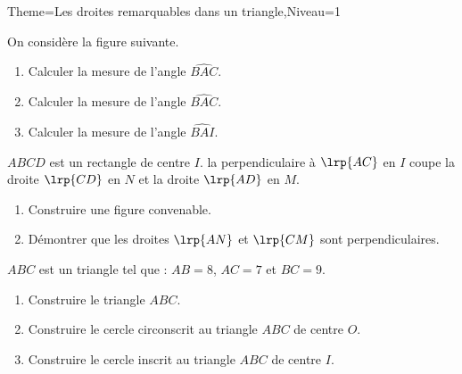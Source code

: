 \documentclass[a4paper,12pt]{article}
\begin{document}
\begin{Maquette}[Fiche]{Theme=Les droites remarquables dans un triangle,Niveau=1}
\begin{exercice}
\begin{minipage}{0.5\linewidth}
On considère la figure suivante.
\begin{enumerate}
\item Calculer la mesure de l'angle $\widehat{BAC}$.
\item Calculer la mesure de l'angle $\widehat{BAC}$.
\item Calculer la mesure de l'angle $\widehat{BAI}$.
\end{enumerate}
\end{minipage}%
\begin{minipage}{0.5\linewidth}
\end{minipage}
\end{exercice}

\begin{exercice}
$ABCD$ est un rectangle de centre $I$. la perpendiculaire à $\lrp{AC}$ en $I$ coupe la droite $\lrp{CD}$ en $N$ et la droite $\lrp{AD}$ en $M$.
\begin{enumerate}
\item Construire une figure convenable.
\item Démontrer que les droites $\lrp{AN}$ et $\lrp{CM}$ sont perpendiculaires.
\end{enumerate}
\end{exercice}

\begin{exercice}
$ABC$ est un triangle tel que : $AB=8$, $AC=7$ et $BC=9$.
\begin{enumerate}
\item Construire le triangle $ABC$.
\item Construire le cercle circonscrit au triangle $ABC$ de centre $O$.
\item Construire le cercle inscrit au triangle $ABC$ de centre $I$.
\end{enumerate}
\end{exercice}











\end{Maquette}
\end{document}
